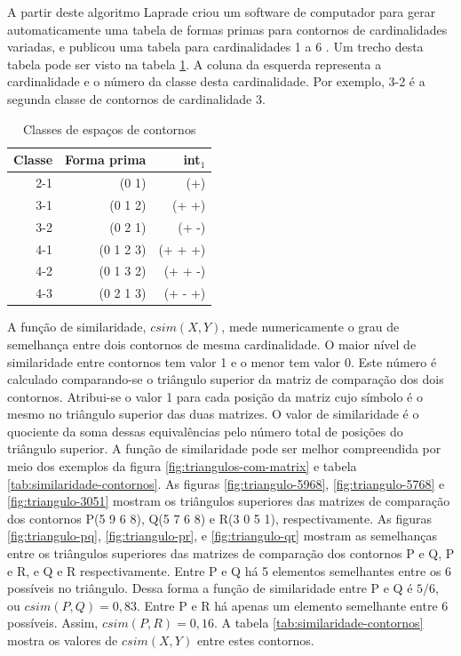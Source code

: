 A partir deste algoritmo Laprade criou um software de computador para
gerar automaticamente uma tabela de formas primas para contornos de
cardinalidades variadas, e publicou uma tabela para cardinalidades 1 a
6 \cite[p. 257]{marvin.ea87:relating}. Um trecho desta tabela pode ser
visto na tabela \ref{tab:c-space-segment-classes}. A coluna da
esquerda representa a cardinalidade e o número da classe desta
cardinalidade. Por exemplo, 3-2 é a segunda classe de contornos de
cardinalidade 3.

\begin{table}
  \centering
  \begin{tabular}{r|rr}
    Classe & Forma prima & int$_1$ \\
    \hline
    2-1 & (0 1) & (+) \\
    3-1 & (0 1 2) & (+ +) \\
    3-2 & (0 2 1) & (+ -) \\
    4-1 & (0 1 2 3) & (+ + +) \\
    4-2 & (0 1 3 2) & (+ + -) \\
    4-3 & (0 2 1 3) & (+ - +)
  \end{tabular}
  \caption{Classes de espaços de contornos}
  \label{tab:c-space-segment-classes}
\end{table}

A função de similaridade, $csim(X,Y)$, mede numericamente o grau de
semelhança entre dois contornos de mesma cardinalidade. O maior nível
de similaridade entre contornos tem valor 1 e o menor tem valor
0. Este número é calculado comparando-se o triângulo superior da
matriz de comparação dos dois contornos. Atribui-se o valor 1 para
cada posição da matriz cujo símbolo é o mesmo no triângulo superior
das duas matrizes. O valor de similaridade é o quociente da soma
dessas equivalências pelo número total de posições do triângulo
superior. A função de similaridade pode ser melhor compreendida por
meio dos exemplos da figura \ref{fig:triangulos-com-matrix} e tabela
\ref{tab:similaridade-contornos}. As figuras \ref{fig:triangulo-5968},
\ref{fig:triangulo-5768} e \ref{fig:triangulo-3051} mostram os
triângulos superiores das matrizes de comparação dos contornos P(5 9 6
8), Q(5 7 6 8) e R(3 0 5 1), respectivamente. As figuras
\ref{fig:triangulo-pq}, \ref{fig:triangulo-pr}, e
\ref{fig:triangulo-qr} mostram as semelhanças entre os triângulos
superiores das matrizes de comparação dos contornos P e Q, P e R, e Q
e R respectivamente. Entre P e Q há 5 elementos semelhantes entre os 6
possíveis no triângulo. Dessa forma a função de similaridade entre P e
Q é $5/6$, ou $csim(P,Q)=0,83$. Entre P e R há apenas um elemento
semelhante entre 6 possíveis. Assim, $csim(P,R)=0,16$. A tabela
\ref{tab:similaridade-contornos} mostra os valores de $csim(X,Y)$
entre estes contornos.

